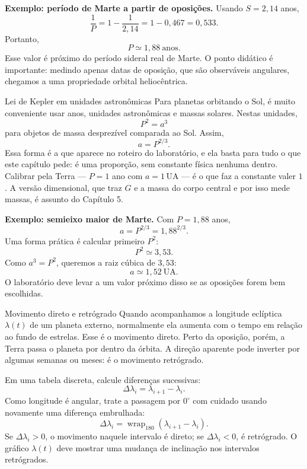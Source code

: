 \documentclass[11pt,a4paper]{article}
\begin{document}
\textbf{Exemplo: período de Marte a partir de oposições.} Usando $S=2{,}14$ anos,
\[
\frac{1}{P}=1-\frac{1}{2{,}14}=1-0{,}467=0{,}533.
\]
Portanto,
\[
P\simeq1{,}88\ \text{anos}.
\]
Esse valor é próximo do período sideral real de Marte. O ponto didático é importante: medindo apenas datas de oposição, que são observáveis angulares, chegamos a uma propriedade orbital heliocêntrica.

\begin{lessonblock}{Lei de Kepler em unidades astronômicas}
Para planetas orbitando o Sol, é muito conveniente usar anos, unidades astronômicas e massas solares. Nestas unidades,
\[
P^2=a^3
\]
para objetos de massa desprezível comparada ao Sol. Assim,
\[
a=P^{2/3}.
\]
Essa forma é a que aparece no roteiro do laboratório, e ela basta para tudo o que este capítulo pede: é uma proporção, sem constante física nenhuma dentro. Calibrar pela Terra --- $P=1$ ano com $a=1\,\mathrm{UA}$ --- é o que faz a constante valer $1$. A versão dimensional, que traz $G$ e a massa do corpo central e por isso mede massas, é assunto do Capítulo 5.
\end{lessonblock}

\textbf{Exemplo: semieixo maior de Marte.} Com $P=1{,}88$ anos,
\[
a=P^{2/3}=1{,}88^{2/3}.
\]
Uma forma prática é calcular primeiro $P^2$:
\[
P^2\simeq3{,}53.
\]
Como $a^3=P^2$, queremos a raiz cúbica de $3{,}53$:
\[
a\simeq1{,}52\ \mathrm{UA}.
\]
O laboratório deve levar a um valor próximo disso se as oposições forem bem escolhidas.

\begin{lessonblock}{Movimento direto e retrógrado}
Quando acompanhamos a longitude eclíptica $\lambda(t)$ de um planeta externo, normalmente ela aumenta com o tempo em relação ao fundo de estrelas. Esse é o movimento direto. Perto da oposição, porém, a Terra passa o planeta por dentro da órbita. A direção aparente pode inverter por algumas semanas ou meses: é o movimento retrógrado.

Em uma tabela discreta, calcule diferenças sucessivas:
\[
\Delta\lambda_i=\lambda_{i+1}-\lambda_i.
\]
Como longitude é angular, trate a passagem por $0^\circ$ com cuidado usando novamente uma diferença embrulhada:
\[
\Delta\lambda_i=\operatorname{wrap}_{180}(\lambda_{i+1}-\lambda_i).
\]
Se $\Delta\lambda_i>0$, o movimento naquele intervalo é direto; se $\Delta\lambda_i<0$, é retrógrado. O gráfico $\lambda(t)$ deve mostrar uma mudança de inclinação nos intervalos retrógrados.
\end{lessonblock}
\end{document}
